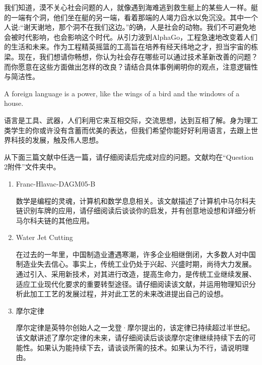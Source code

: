\documentclass[12pt,a4paper]{article}
\begin{document}
\newpage
{}
{}
\begin{ACEEquestion}{1.4}{\xiaosihao}{\youyuan}
我们知道，漠不关心社会问题的人，就像遇到海难逃到救生艇上的某些人一样。艇的一端有个洞，他们坐在艇的另一端，看着那端的人竭力舀水以免沉没。其中一个人说:``谢天谢地，那个洞不在我们这边。''的确，人是社会的动物。我们不可避免地会被时代影响，也会影响这个时代。从引力波到AlphaGo，工程急速地改变着人们的生活和未来。作为工程精英摇篮的工高旨在培养有经天纬地之才，担当宇宙的栋梁。现在，我们想请你畅想，你认为社会存在哪些可以通过技术革新改善的问题？而你愿意在这些方面做出怎样的改良？请结合具体事例阐明你的观点，注意逻辑性与简洁性。
\end{ACEEquestion}
\newpage
{}
\begin{ACEEquestion}{1.2}{\xiaosihao}{\youyuan}
A foreign language is a power, like the wings of a bird and the windows of a house. \par 
语言是工具、武器，人们利用它来互相交际，交流思想，达到互相了解。身为理工类学生的你或许没有含蓄而优美的表达，但我们希望你能好好利用语言，去跟上世界科技的发展，触及伟人思想。\par
从下面三篇文献中任选一篇，请仔细阅读后完成对应的问题。文献均在``Question 2附件''文件夹中。\par

\begin{enumerate}[label=(\arabic*)]
\item Franc-Hlavac-DAGM05-B\par
数学是编程的灵魂，计算机和数学息息相关。该文献描述了计算机中马尔科夫链识别车牌的应用，请仔细阅读后谈谈你的启发，并有创意地设想和详细分析马尔科夫链的其他应用。\par
\item Water Jet Cutting\par
在过去的一年里，中国制造业遭遇寒潮，许多企业相继倒闭，大多数人对中国制造业失去信心。事实上，传统工业仍处于兴起、兴盛时期，尚待大力发展。通过引入、采用新技术，对其进行改造，提高生命力，是传统工业继续发展、适应工业现代化要求的重要转型途径。请仔细阅读该文献，并运用物理知识分析此加工工艺的发展过程，并对此工艺的未来改进提出自己的设想。\par
\item 摩尔定律\par
摩尔定律是英特尔创始人之一戈登·摩尔提出的，该定律已持续超过半世纪。该文献讲述了摩尔定律的未来，请仔细阅读后谈谈摩尔定律继续持续下去的可能性。如果认为能持续下去，请谈谈所需的技术。如果认为不行，请说明理由。\par
\end{enumerate}
\end{ACEEquestion}
\newpage		
{}
\end{document}
